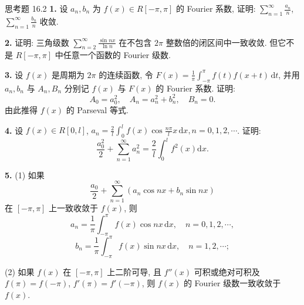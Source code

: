 \begin{exblock}{思考题 16.2}
\textbf{1.} 设 $a_{n}, b_{n}$ 为 $f(x) \in R[-\pi, \pi]$ 的 Fourier 系数, 证明: $\sum_{n=1}^{\infty} \frac{a_{n}}{n}$, $\sum_{n=1}^{\infty} \frac{b_{n}}{n}$ 收敛.

\textbf{2.} 证明: 三角级数 $\sum_{n=2}^{\infty} \frac{\sin nx}{\ln n}$ 在不包含 $2\pi$ 整数倍的闭区间中一致收敛. 但它不是 $R[-\pi, \pi]$ 中任意一个函数的 Fourier 级数.

\textbf{3.} 设 $f(x)$ 是周期为 $2\pi$ 的连续函数, 令 $F(x) = \frac{1}{\pi}\int_{-\pi}^{\pi} f(t) f(x+t) \,\mathrm{d}t$, 并用 $a_{n}, b_{n}$ 与 $A_{n}, B_{n}$ 分别记 $f(x)$ 与 $F(x)$ 的 Fourier 系数. 证明:
\[
  A_{0}=a_{0}^{2},\quad A_{n}=a_{n}^{2}+b_{n}^{2},\quad B_{n}=0.
\]
由此推得 $f(x)$ 的 Parseval 等式.

\textbf{4.} 设 $f(x) \in R[0, l]$, $a_n = \frac{2}{l} \int_0^l f(x) \cos \frac{n\pi}{l} x \, \mathrm{d}x, n = 0, 1, 2, \cdots$. 证明:
\[
  \frac{a_{0}^{2}}{2}+\sum_{n=1}^{\infty}a_{n}^{2}=\frac{2}{l}\int_{0}^{l}f^{2}(x)\mathrm{d}x.
\]

\textbf{5.} (1) 如果
\[
  \frac{a_{0}}{2}+\sum_{n=1}^{\infty}(a_{n}\cos nx+b_{n}\sin nx)
\]
在 $[-\pi, \pi]$ 上一致收敛于 $f(x)$, 则
\[
  a_{n}=\frac{1}{\pi}\int_{-\pi}^{\pi}f(x)\cos n x\,\mathrm{d}x,\quad n=0,1,2,\cdots,
\]
\[
  b_{n}=\frac{1}{\pi}\int_{-\pi}^{\pi}f(x)\sin n x\,\mathrm{d}x,\quad n=1,2,\cdots;
\]

(2) 如果 $f(x)$ 在 $[-\pi, \pi]$ 上二阶可导, 且 $f''(x)$ 可积或绝对可积及 $f(\pi) = f(-\pi)$, $f'(\pi) = f'(-\pi)$, 则 $f(x)$ 的 Fourier 级数一致收敛于 $f(x)$.
\end{exblock}
